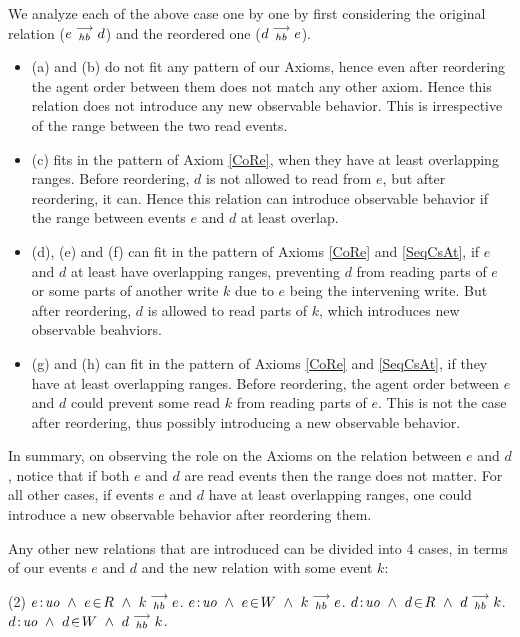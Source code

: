     We analyze each of the above case one by one by first considering the original relation ($e\stackrel{\longrightarrow}{_{hb}}d$) and the reordered one ($d\stackrel{\longrightarrow}{_{hb}}e$). 
    \begin{itemize}
        \item (a) and (b) do not fit any pattern of our Axioms, hence even after reordering the agent order between them does not match any other axiom. Hence this relation does not introduce any new observable behavior. This is irrespective of the range between the two read events.
        \item (c) fits in the pattern of Axiom \ref{CoRe}, when they have at least overlapping ranges. Before reordering, $d$ is not allowed to read from $e$, but after reordering, it can. Hence this relation can introduce observable behavior if the range between events $e$ and $d$ at least overlap. 
        \item (d), (e) and (f) can fit in the pattern of Axioms \ref{CoRe} and \ref{SeqCsAt}, if $e$ and $d$ at least have overlapping ranges, preventing $d$ from reading parts of $e$ or some parts of another write $k$ due to $e$ being the intervening write. But after reordering, $d$ is allowed to read parts of $k$, which introduces new observable beahviors.
        \item (g) and (h) can fit in the pattern of Axioms \ref{CoRe} and \ref{SeqCsAt}, if they have at least overlapping ranges. Before reordering, the agent order between $e$ and $d$ could prevent some read $k$ from reading parts of $e$. This is not the case after reordering, thus possibly introducing a new observable behavior. 
    \end{itemize}

    In summary, on observing the role on the Axioms on the relation between $e$ and $d$, notice that if both $e$ and $d$ are read events then the range does not matter. For all other cases, if events $e$ and $d$ have at least overlapping ranges, one could introduce a new observable behavior after reordering them.
    
    
    Any other new relations that are introduced can be divided into 4 cases, in terms of our events $e$ and $d$ and the new relation with some event $k$:
    \begin{tasks}(2)
        \task  $\et{e}{uo} \ \wedge \ \event{e}{R} \ \wedge \ \reln{k}{hb}{e}$.
        \task  $e\!:\!\textit{uo} \ \wedge \ e\!\in\!W \ \wedge \ k\stackrel{\longrightarrow}{_{hb}}e$.
        \task  $\et{d}{uo} \ \wedge \ \event{d}{R} \ \wedge \ \reln{d}{hb}{k}$.
        \task  $d\!:\!\textit{uo} \ \wedge \ d\!\in\!W \ \wedge \ d\stackrel{\longrightarrow}{_{hb}}k$.
    \end{tasks}
    
